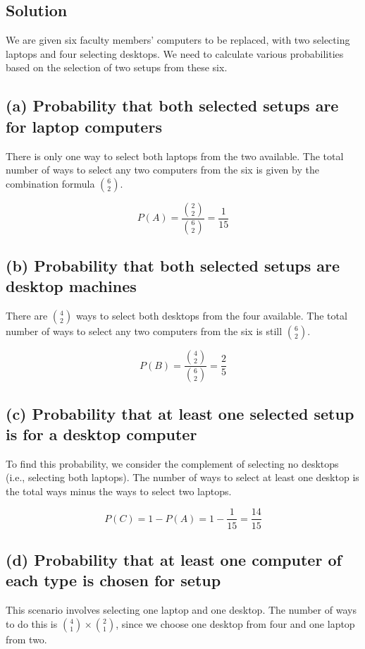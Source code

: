 \documentclass{article}
\begin{document}
\subsection*{Solution}

We are given six faculty members' computers to be replaced, with two selecting laptops and four selecting desktops. We need to calculate various probabilities based on the selection of two setups from these six.

\subsection*{(a) Probability that both selected setups are for laptop computers}
There is only one way to select both laptops from the two available. The total number of ways to select any two computers from the six is given by the combination formula $\binom{6}{2}$.

\[
P(A) = \frac{\binom{2}{2}}{\binom{6}{2}} = \frac{1}{15}
\]

\subsection*{(b) Probability that both selected setups are desktop machines}
There are $\binom{4}{2}$ ways to select both desktops from the four available. The total number of ways to select any two computers from the six is still $\binom{6}{2}$.

\[
P(B) = \frac{\binom{4}{2}}{\binom{6}{2}} = \frac{2}{5}
\]

\subsection*{(c) Probability that at least one selected setup is for a desktop computer}
To find this probability, we consider the complement of selecting no desktops (i.e., selecting both laptops). The number of ways to select at least one desktop is the total ways minus the ways to select two laptops.

\[
P(C) = 1 - P(A) = 1 - \frac{1}{15} = \frac{14}{15}
\]

\subsection*{(d) Probability that at least one computer of each type is chosen for setup}
This scenario involves selecting one laptop and one desktop. The number of ways to do this is $\binom{4}{1} \times \binom{2}{1}$, since we choose one desktop from four and one laptop from two.
\end{document}
